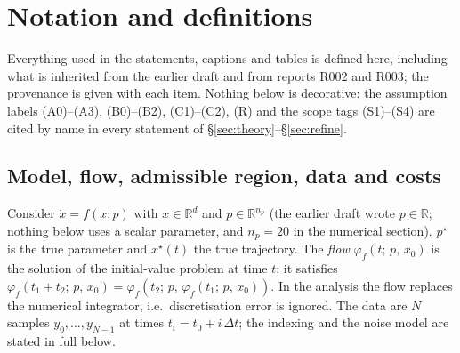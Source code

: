 \documentclass[11pt]{article}
\theoremstyle{remark}\newtheorem{remark}{Remark}
\newcommand{\pstar}{p^\star}
\newcommand{\flow}[3]{\varphi_f(#1;\,#2,\,#3)}
\begin{document}
\section{Notation and definitions}\label{sec:defs}
Everything used in the statements, captions and tables is defined here, including what is inherited from the earlier draft and from reports R002 and R003; the provenance is given with each item. Nothing below is decorative: the assumption labels (A0)--(A3), (B0)--(B2), (C1)--(C2), (R) and the scope tags (S1)--(S4) are cited by name in every statement of \S\ref{sec:theory}--\S\ref{sec:refine}.

\subsection{Model, flow, admissible region, data and costs}\label{sec:model}
Consider $\dot x=f(x;p)$ with $x\in\mathbb R^{d}$ and $p\in\mathbb R^{n_p}$ (the earlier draft wrote $p\in\mathbb R$; nothing below uses a scalar parameter, and $n_p=20$ in the numerical section). $\pstar$ is the true parameter and $x^\star(t)$ the true trajectory. The \emph{flow} $\flow{t}{p}{x_0}$ is the solution of the initial-value problem at time $t$; it satisfies $\flow{t_1+t_2}{p}{x_0}=\flow{t_2}{p}{\flow{t_1}{p}{x_0}}$. In the analysis the flow replaces the numerical integrator, i.e.\ discretisation error is ignored. The data are $N$ samples $y_0,\dots,y_{N-1}$ at times $t_i=t_0+i\,\Delta t$; the indexing and the noise model are stated in full below.
\end{document}
